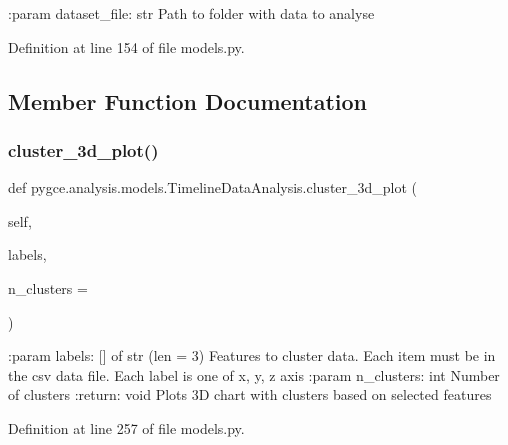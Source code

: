 \begin{DoxyVerb}:param dataset_file: str
    Path to folder with data to analyse
\end{DoxyVerb}
 

Definition at line 154 of file models.\+py.



\subsection{Member Function Documentation}
\mbox{\label{classpygce_1_1analysis_1_1models_1_1_timeline_data_analysis_a981ac0211fd075b7fae599a09f385314}} 
\subsubsection{\texorpdfstring{cluster\+\_\+3d\+\_\+plot()}{cluster\_3d\_plot()}}
{\footnotesize\ttfamily def pygce.\+analysis.\+models.\+Timeline\+Data\+Analysis.\+cluster\+\_\+3d\+\_\+plot (\begin{DoxyParamCaption}\item[{}]{self,  }\item[{}]{labels,  }\item[{}]{n\+\_\+clusters = {} }\end{DoxyParamCaption})}

\begin{DoxyVerb}:param labels: [] of str (len = 3)
    Features to cluster data. Each item must be in the csv data file. Each label is one of x, y, z axis
:param n_clusters: int
    Number of clusters
:return: void
    Plots 3D chart with clusters based on selected features
\end{DoxyVerb}
 

Definition at line 257 of file models.\+py.

\mbox{\label{classpygce_1_1analysis_1_1models_1_1_timeline_data_analysis_a4bdbc9b67a365b2e0d5a76e7bd811ce5}} 
